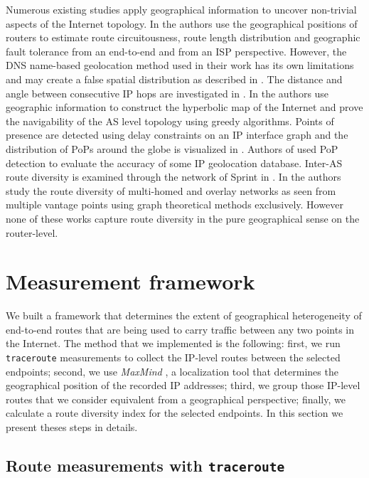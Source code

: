 \documentclass[peerreview]{IEEEtran}
\begin{document}
Numerous existing studies apply geographical information to uncover non-trivial
aspects of the Internet topology. In \cite{subramanian2002geographic} the
authors use the geographical positions of routers to estimate route
circuitousness, route length distribution and geographic fault tolerance from an
end-to-end and from an ISP perspective. However, the DNS name-based geolocation
method used in their work has its own limitations and may create a false spatial
distribution as described in \cite{zhang2006dns}. The distance and angle between
consecutive IP hops are investigated in \cite{laki_detailed_2009}. In
\cite{boguna2010sustaining} the authors use geographic information to construct
the hyperbolic map of the Internet and prove the navigability of the AS level
topology using greedy algorithms. Points of presence are detected using delay
constraints on an IP interface graph and the distribution of PoPs around the
globe is visualized in \cite{shavitt2012geographical}. Authors of
\cite{shavitt2010structural} used PoP detection to evaluate the accuracy of some
IP geolocation database. Inter-AS route diversity is examined through the
network of Sprint in \cite{teixeira2003search}. In \cite{han2006experimental}
the authors study the route diversity of multi-homed and overlay networks as
seen from multiple vantage points using graph theoretical methods exclusively.
However none of these works capture route diversity in the pure geographical
sense on the router-level.

\section{Measurement framework}
\label{sec:measurement}

We built a framework that determines the extent of geographical heterogeneity of
end-to-end routes that are being used to carry traffic between any two points in
the Internet. The method that we implemented is the following: first, we run
\texttt{traceroute} measurements to collect the IP-level routes between the
selected endpoints; second, we use \textit{MaxMind} \cite{maxmind}, a
localization tool that determines the geographical position of the recorded IP
addresses; third, we group those IP-level routes that we consider equivalent
from a geographical perspective; finally, we calculate a route diversity index
for the selected endpoints. In this section we present theses steps in details.

\subsection{Route measurements with \texttt{traceroute}}
\end{document}

